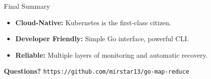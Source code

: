 \documentclass[10pt,aspectratio=169]{beamer}
\begin{document}
\begin{frame}{Final Summary}
    \begin{itemize}
        \item \textbf{Cloud-Native:} Kubernetes is the first-class citizen.
        \item \textbf{Developer Friendly:} Simple Go interface, powerful CLI.
        \item \textbf{Reliable:} Multiple layers of monitoring and automatic recovery.
    \end{itemize}
    \vfill
    \centering
    \Huge \textbf{Questions?}
    \vfill
    \normalsize \texttt{https://github.com/mirstar13/go-map-reduce}
\end{frame}
\end{document}
